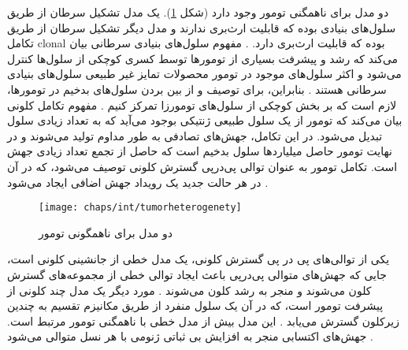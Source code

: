 دو مدل برای ناهمگنی تومور وجود دارد (شکل \ref{fig:ch_intr:tumorheterogenety}). یک مدل تشکیل سرطان از طریق سلول‌های بنیادی بوده که قابلیت ارث‌بری ندارند و مدل دیگر تشکیل سرطان از طریق تکامل \gls{clonal} بوده که قابلیت ارث‌بری دارد. \cite{birbrair2014type}. مفهوم سلول‌های بنیادی سرطانی بیان می‌کند که رشد و پیشرفت بسیاری از تومور‌ها توسط کسری کوچکی از سلول‌ها کنترل می‌شود و اکثر سلول‌های موجود در تومور محصولات تمایز غیر طبیعی سلول‌های بنیادی سرطانی هستند \cite{birbrair2014type}. بنابراین، برای توصیف و از بین بردن سلول‌های بدخیم در تومورها، لازم است که بر بخش کوچکی از سلول‌های تومورزا تمرکز کنیم \cite{handa2011redox}. مفهوم تکامل کلونی بیان می‌کند که تومور از یک سلول طبیعی ژنتیکی بوجود می‌آید که به تعداد زیادی سلول تبدیل می‌شود. در این تکامل، جهش‌های تصادفی به طور مداوم تولید می‌شوند و در نهایت تومور حاصل میلیارد‌ها سلول بدخیم است که حاصل از تجمع تعداد زیادی جهش است\cite{halford2005o6}. تکامل تومور به عنوان توالی پی‌درپی گسترش کلونی توصیف می‌شود، که در آن در هر حالت جدید یک رویداد جهش اضافی ایجاد می‌شود \cite{birbrair2014type}. 

\begin{figure}[!ht]
	\centerline{\texttt{[image: chaps/int/tumorheterogenety]}}
	\caption{دو مدل برای ناهمگونی تومور}
	\label{fig:ch_intr:tumorheterogenety}
\end{figure}

یکی از توالی‌های پی در پی گسترش کلونی، یک مدل خطی از جانشینی کلونی است، جایی که جهش‌های متوالی پی‌درپی باعث ایجاد توالی خطی از مجموعه‌های گسترش کلون می‌شوند و منجر به رشد کلون می‌شوند \cite{birbrair2014type}. مورد دیگر یک مدل چند کلونی از پیشرفت تومور است، که در آن یک سلول منفرد از طریق مکانیزم تقسیم به چندین زیرکلون گسترش می‌یابد \cite{lee2011promoter}. این مدل بیش از مدل خطی با ناهمگنی تومور مرتبط است. جهش‌های اکتسابی منجر به افزایش بی ثباتی ژنومی با هر نسل متوالی می‌شود \cite{cooper1992elements}. 

